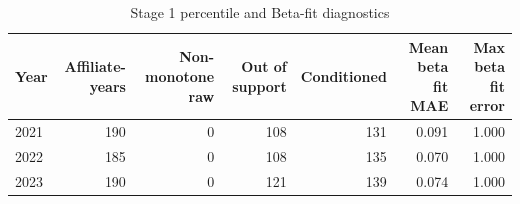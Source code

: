 \begin{table}[H]
\centering
\footnotesize
\setlength{\tabcolsep}{3pt}
\caption{Stage 1 percentile and Beta-fit diagnostics}
\label{tab:app_stage1_conditioning}
\begin{tabular}{@{}lrrrrrr@{}}
\toprule
Year & Affiliate-years & Non-monotone raw & Out of support & Conditioned & Mean beta fit MAE & Max beta fit error \\
\midrule
2021 & 190 & 0 & 108 & 131 & 0.091 & 1.000 \\
2022 & 185 & 0 & 108 & 135 & 0.070 & 1.000 \\
2023 & 190 & 0 & 121 & 139 & 0.074 & 1.000 \\
\bottomrule
\end{tabular}
\end{table}

